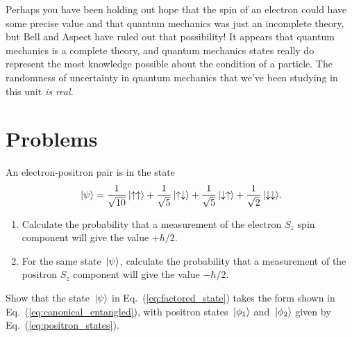 Perhaps you have been holding out hope that the spin of an electron
could have some precise value and that quantum mechanics was just an
incomplete theory, but Bell and Aspect have ruled out that possibility!
It appears that quantum mechanics is a complete theory, and quantum
mechanics states really do represent the most knowledge possible about
the condition of a particle.  The randomness of uncertainty in quantum 
mechanics that we've been studying in this unit \emph{is real.}


\newpage

\section*{Problems}
\label{sec:quantum_entanglement_problems}

\begin{problem}
  \label{prob:entangled_i}
  An electron-positron pair is in the state
  \[
  \,|\mbox{$\psi$}\rangle = \frac{1}{\sqrt{10}}\,|\mbox{$\uparrow\uparrow$}\rangle
  +\frac{1}{\sqrt{5}}\,|\mbox{$\uparrow\downarrow$}\rangle +
  \frac{1}{\sqrt{5}}\,|\mbox{$\downarrow\uparrow$}\rangle +
  \frac{1}{\sqrt{2}}\,|\mbox{$\downarrow\downarrow$}\rangle .
  \]
  \begin{enumerate}
  \item Calculate the probability that a measurement of the electron
    $S_z$ spin component will give the value $+\hbar/2$.
  \item For the same state $\,|\mbox{$\psi$}\rangle$, calculate the probability
    that a measurement of the positron $S_z$ component will give the
    value $-\hbar/2$.
  \end{enumerate}
\end{problem}



\begin{problem}
  Show that the state $\,|\mbox{$\psi$}\rangle$ in
  Eq.~(\ref{eq:factored_state}) takes the form shown in
  Eq.~(\ref{eq:canonical_entangled}), with positron states
  $\,|\mbox{$\phi_1$}\rangle$ and $\,|\mbox{$\phi_2$}\rangle$ given by
  Eq.~(\ref{eq:positron_states}).
\end{problem}

